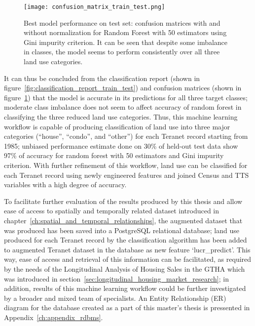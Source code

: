 \begin{figure}[hbt!]
    \centering
    \texttt{[image: confusion\_matrix\_train\_test.png]}
    \caption{Best model performance on test set: confusion matrices with and without normalization for Random Forest with 50 estimators using Gini impurity criterion.
    It can be seen that despite some imbalance in classes, the model seems to perform consistently over all three land use categories.}
    \label{fig:confusion_matrix_train_test}
\end{figure}

It can thus be concluded from the classification report (shown in figure~\ref{fig:classification_report_train_test}) and confusion matrices (shown in figure~\ref{fig:confusion_matrix_train_test}) that the model is accurate in its predictions for all three target classes;
moderate class imbalance does not seem to affect accuracy of random forest in classifying the three reduced land use categories.
Thus, this machine learning workflow is capable of producing classification of land use into three major categories (``house'', ``condo'', and ``other'') for each Teranet record starting from 1985;
unbiased performance estimate done on 30\% of held-out test data show 97\% of accuracy for random forest with 50 estimators and Gini impurity criterion.
With further refinement of this workflow, land use can be classified for each Teranet record using newly engineered features and joined Census and TTS variables with a high degree of accuracy.

To facilitate further evaluation of the results produced by this thesis and allow ease of access to spatially and temporally related dataset introduced in chapter~\ref{ch:spatial_and_temporal_relationships}, the augmented dataset that was produced has been saved into a PostgreSQL relational database;
land use produced for each Teranet record by the classification algorithm has been added to augmented Teranet dataset in the database as new feature `lucr\_predict'.
This way, ease of access and retrieval of this information can be facilitated, as required by the needs of the Longitudinal Analysis of Housing Sales in the GTHA which was introduced in section~\ref{sec:longitudinal_housing_market_research};
in addition, results of this machine learning workflow could be further investigated by a broader and mixed team of specialists.
An Entity Relationship (ER) diagram for the database created as a part of this master's thesis is pressented in Appendix~\ref{ch:appendix_rdbms}.


